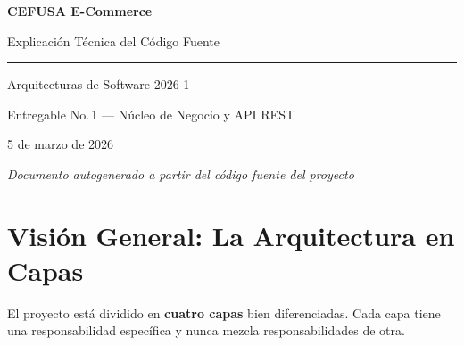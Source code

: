\documentclass[12pt, a4paper]{article}
\begin{document}

\begin{titlepage}
  \centering
  \vspace*{2cm}
  {\Huge\bfseries\color{accent} CEFUSA E-Commerce\par}
  \vspace{0.5cm}
  {\Large Explicación Técnica del Código Fuente\par}
  \vspace{1cm}
  \rule{\linewidth}{1pt}
  \vspace{0.5cm}
  {\large Arquitecturas de Software 2026-1\par}
  {\large Entregable No.\,1 — Núcleo de Negocio y API REST\par}
  \vspace{1.5cm}
  {\normalsize 5 de marzo de 2026\par}
  \vfill
  \textit{Documento autogenerado a partir del código fuente del proyecto}
\end{titlepage}

\tableofcontents
\clearpage

\section{Visión General: La Arquitectura en Capas}

El proyecto está dividido en \textbf{cuatro capas} bien diferenciadas. Cada capa tiene
una responsabilidad específica y nunca mezcla responsabilidades de otra.
\end{document}
